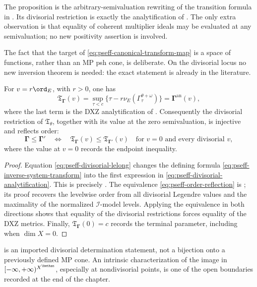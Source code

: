 The proposition is the arbitrary-semivaluation rewriting of the transition
formula in \cite[Definition~3.3]{DXZ23}.  Its divisorial restriction is
exactly the analytification of
\cite[Definition~3.11]{Xia23Operations}.  The only extra observation is
that equality of coherent multiplier ideals may be evaluated at any
semivaluation; no new positivity assertion is involved.

The fact that the target of \eqref{eq:pseff-canonical-transform-map} is a
space of functions, rather than an MP psh cone, is deliberate.  On the
divisorial locus no new inversion theorem is needed: the exact statement is
already in the literature.

\begin{theorem}\label{thm:pseff-divisorial-inversion}
For \(v=r\ord_E\), with \(r>0\), one has
\[
 \mathfrak T_{\boldsymbol\Gamma}(v)
 =\sup_{\tau<c}\{\tau-r\nu_E(
       \Gamma^{\theta+\omega}_\tau)\}
 =\boldsymbol\Gamma^{\mathrm{an}}(v),
\tag{71.31}\label{eq:pseff-divisorial-analytification}
\]
where the last term is the DXZ analytification of
\cite[Definition~3.11]{Xia23Operations}.  Consequently the divisorial
restriction of \(\mathfrak T_\theta\), together with its value at the
zero semivaluation, is injective and reflects order:
\[
 \boldsymbol\Gamma\leq\boldsymbol\Gamma'
 \quad\Longleftrightarrow\quad
 \mathfrak T_{\boldsymbol\Gamma}(v)
 \leq\mathfrak T_{\boldsymbol\Gamma'}(v)
 \quad\text{for }v=0\text{ and every divisorial }v,
\tag{71.32}\label{eq:pseff-order-reflection}
\]
where the value at \(v=0\) records the endpoint inequality.
\end{theorem}

\begin{proof}
Equation \eqref{eq:pseff-divisorial-lelong} changes the defining formula
\eqref{eq:pseff-inverse-system-transform} into the first expression in
\eqref{eq:pseff-divisorial-analytification}.  This is precisely
\cite[formula~(3.7)]{Xia23Operations}.  The equivalence
\eqref{eq:pseff-order-reflection} is
\cite[Lemma~4.2]{Xia23Operations}; its proof recovers the levelwise order
from all divisorial Legendre values and the maximality of the normalized
\(\mathcal I\)-model levels.  Applying the equivalence in both directions
shows that equality of the divisorial restrictions forces equality of the
DXZ metrics.  Finally,
\(\mathfrak T_{\boldsymbol\Gamma}(0)=c\) records the terminal parameter,
including when \(\dim X=0\).
\end{proof}

\begin{remark}\label{rem:pseff-injection-not-bijection}
 is an imported divisorial
determination statement, not a
bijection onto a previously defined MP cone.  An intrinsic
characterization of the image in
$[ -\infty,+\infty)^{X^{\bethan}}$, especially at nondivisorial points,
is one of the open boundaries recorded at the end of the chapter.
\end{remark}

